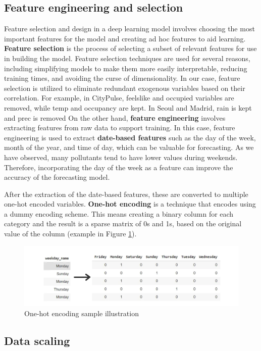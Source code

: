 \subsection{Feature engineering and selection}
Feature selection and design in a deep learning model involves choosing the most important features for the model and creating ad hoc features to aid learning. 
\textbf{Feature selection} is the process of selecting a subset of relevant features for use in building the model.
Feature selection techniques are used for several reasons, including simplifying models to make them more easily interpretable, reducing training times, and avoiding the curse of dimensionality.
In our case, feature selection is utilized to eliminate redundant exogenous variables based on their correlation.
For example, in CityPulse, feelslike and occupied variables are removed, while temp and occupancy are kept. In Seoul and Madrid, rain is kept and prec is removed
On the other hand, \textbf{feature engineering} involves extracting features from raw data to support training.
In this case, feature engineering is used to extract \textbf{date-based features} such as the day of the week, month of the year, and time of day, which can be valuable for forecasting. As we have observed, many pollutants tend to have lower values during weekends. Therefore, incorporating the day of the week as a feature can improve the accuracy of the forecasting model.


After the extraction of the date-based features, these are converted to multiple one-hot encoded variables. \textbf{One-hot encoding} is a technique that encodes using a dummy encoding scheme. This means creating a binary column for each category and the result is a sparse matrix of 0s and 1s, based on the original value of the column (example in Figure \ref{fig:one-hot}).
\begin{figure}
    \centering
    \includegraphics[width=0.75\linewidth]{images/onehotencoding.png}
    \caption{One-hot encoding sample illustration \cite{onehotencoding}}
    \label{fig:one-hot}
\end{figure}

\subsection{Data scaling}

